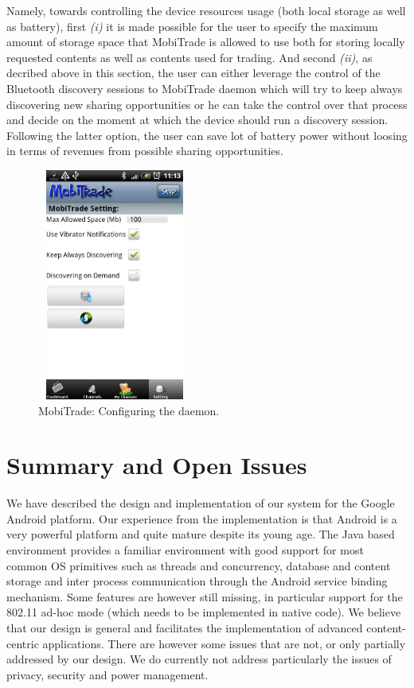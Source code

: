 Namely, towards controlling the device resources usage (both local storage as well as battery), first  \emph{(i)} it is made possible for the user to specify the maximum amount of storage space that MobiTrade is allowed to use both for storing locally requested contents as well as contents used for trading. And second \emph{(ii)}, as decribed above in this section, the user can either leverage the control of the Bluetooth discovery sessions to MobiTrade daemon which will try to keep always discovering new sharing opportunities or he can take the control over that process and decide on the moment at which the device should run a discovery session. Following the latter option, the user can save lot of battery power without loosing in terms of revenues from possible sharing opportunities.

 
\begin{figure}[!h]
\begin{center}
\includegraphics[width=2in,height=3in]{Chapitre6/Config.png}
\end{center}
\caption{MobiTrade: Configuring the daemon.}
\label{Config}
\end{figure}


\section{Summary and Open Issues}
\label{MobiTradeSoftSummary}
We have described the design and implementation of our system for the Google Android platform. Our experience from the implementation is that Android is a very powerful platform and quite mature despite its young age. The Java based environment provides a familiar environment with good support for most common OS primitives such as threads and concurrency, database and content storage and inter process communication through the Android service binding mechanism. Some features are however still missing, in particular support for the 802.11 ad-hoc mode (which needs to be implemented in native code). We believe that our design is general and facilitates the implementation of 
advanced content-centric applications. There are however some issues that are not, or only partially addressed by our design. We do currently not address particularly the issues of privacy, security and power management.
